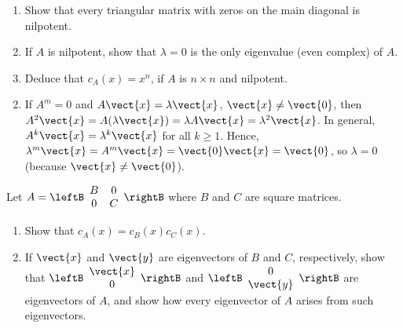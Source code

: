 \begin{multicols}{2}
\begin{ex}
\begin{enumerate}[label={\alph*.}]
\item Show that every triangular matrix with zeros on the main diagonal is nilpotent.

\item If $A$ is nilpotent, show that $\lambda = 0$ is the only eigenvalue (even complex) of $A$.

\item Deduce that $c_{A}(x) = x^{n}$, if $A$ is $n \times n$ and nilpotent.

\end{enumerate}
\begin{sol}
\begin{enumerate}[label={\alph*.}]
\setcounter{enumi}{1}
\item  If $A^{m} = 0$ and $A\vect{x} = \lambda\vect{x}$, $\vect{x} \neq \vect{0}$, then $A^{2}\vect{x} = A(\lambda\vect{x}) = \lambda A\vect{x} = \lambda^{2}\vect{x}$. In general, $A^{k}\vect{x} = \lambda^{k}\vect{x}$ for all $k \geq 1$. Hence, $\lambda^{m}\vect{x} = A^{m}\vect{x} = \vect{0}\vect{x} = \vect{0}$, so $\lambda = 0$ (because $\vect{x} \neq \vect{0}$).

\end{enumerate}
\end{sol}
\end{ex}


\begin{ex}
Let $A = \leftB \begin{array}{cc}
B & 0 \\
0 & C 
\end{array}\rightB$
 where $B$ and $C$ are square matrices.


\begin{enumerate}[label={\alph*.}]
\item Show that $c_{A}(x) = c_{B}(x)c_{C}(x)$.

\item If $\vect{x}$ and $\vect{y}$ are eigenvectors of $B$ and $C$, respectively, show that $\leftB \begin{array}{c}
\vect{x} \\
0
\end{array}\rightB$
 and $\leftB \begin{array}{c}
0 \\
\vect{y}
\end{array}\rightB$
 are eigenvectors of $A$, and show how every eigenvector of $A$ arises from such eigenvectors.

\end{enumerate}
\end{ex}

\end{multicols}








